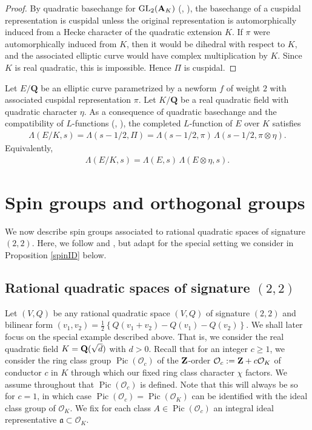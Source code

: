 \documentclass{amsart}
\theoremstyle{definition}
\begin{document}
\begin{proof}  

By quadratic basechange for $\operatorname{GL}_2({\bf{A}}_K)$ (\cite{La}, \cite[Ch.~3]{AC}), the basechange of a cuspidal representation is cuspidal
unless the original representation is automorphically induced from a Hecke character of the quadratic extension $K$.
If $\pi$ were automorphically induced from $K$, then it would be dihedral with respect to $K$,
and the associated elliptic curve would have complex multiplication by $K$. Since $K$ is real quadratic, this is impossible. Hence $\Pi$ is cuspidal. \end{proof}

Let $E/\mathbf Q$ be an elliptic curve parametrized by a newform $f$ of weight $2$ with associated cuspidal representation $\pi$.
Let $K/\mathbf Q$ be a real quadratic field with quadratic character $\eta$. 
As a consequence of quadratic basechange and the compatibility of $L$-functions (\cite{La}, \cite{AC}), the completed $L$-function of $E$ over $K$ satisfies
\begin{align*} \Lambda(E/K,s) = \Lambda(s-1/2,\Pi) = \Lambda(s-1/2,\pi)\,\Lambda(s-1/2,\pi\otimes\eta). \end{align*}
Equivalently,
\begin{align*} \Lambda(E/K,s) = \Lambda(E,s)\,\Lambda(E\otimes\eta,s). \end{align*} 

\section{Spin groups and orthogonal groups}

We now describe spin groups associated to rational quadratic spaces of signature $(2, 2)$.
Here, we follow \cite[$\S$ 2.3-2.7]{Br} and \cite[$\S$ 2-4]{BY}, but adapt for the special setting we consider in Proposition \ref{spinID} below.

\subsection{Rational quadratic spaces of signature $(2, 2)$}

Let $(V, Q)$ be any rational quadratic space $(V, Q)$ of signature $(2,2)$ and bilinear form $(v_1, v_2) = \frac{1}{2} \left\lbrace Q(v_1 + v_2) - Q(v_1) - Q(v_2) \right\rbrace$.
We shall later focus on the special example described above. That is, we consider the real quadratic field $K = {\bf{Q}}(\sqrt{d})$ with $d > 0$. 
Recall that for an integer $c \geq 1$, we consider the ring class group $\operatorname{Pic}(\mathcal{O}_c)$ 
of the ${\bf{Z}}$-order $\mathcal{O}_c := {\bf{Z}} + c \mathcal{O}_K$ of conductor $c$ in $K$ through which 
our fixed ring class character $\chi$ factors. We assume throughout that $\operatorname{Pic}(\mathcal{O}_c)$ is defined.
Note that this will always be so for $c=1$, in which case $\operatorname{Pic}(\mathcal{O}_c) = \operatorname{Pic}(\mathcal{O}_K)$
can be identified with the ideal class group of $\mathcal{O}_K$. 
We fix for each class $A \in \operatorname{Pic}(\mathcal{O}_c)$ an integral ideal representative $\mathfrak{a} \subset \mathcal{O}_K$. 
\end{document}

